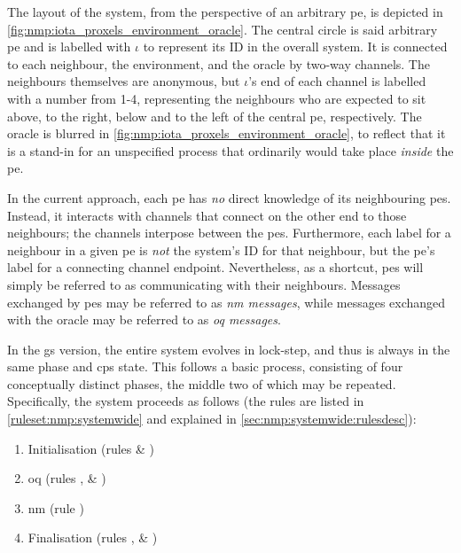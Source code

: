 The layout of the system, from the perspective of an arbitrary \gls{pe}, is depicted in \cref{fig:nmp:iota_proxels_environment_oracle}.  The central circle is said arbitrary \gls{pe} and is labelled with \(\iota\) to represent its ID in the overall system.  It is connected to each neighbour, the environment, and the oracle by two-way channels.  The neighbours themselves are anonymous, but \(\iota\)'s end of each channel is labelled with a number from 1-4, representing the neighbours who are expected to sit above, to the right, below and to the left of the central \gls{pe}, respectively.  The oracle is blurred in \cref{fig:nmp:iota_proxels_environment_oracle}, to reflect that it is a stand-in for an unspecified process that ordinarily would take place \emph{inside} the \gls{pe}.

In the current approach, each \gls{pe} has \emph{no} direct knowledge of its neighbouring \glspl{pe}.  Instead, it interacts with channels that connect on the other end to those neighbours; the channels interpose between the \glspl{pe}.  Furthermore, each label for a neighbour in a given \gls{pe} is \emph{not} the system's ID for that neighbour, but the \gls{pe}'s label for a connecting channel endpoint.  Nevertheless, as a shortcut, \glspl{pe} will simply be referred to as communicating with their neighbours.  Messages exchanged by \glspl{pe} may be referred to as \emph{\gls{nm} messages}, while messages exchanged with the oracle may be referred to as \emph{\gls{oq} messages}.

In the \gls{gs} version, the entire system evolves in lock-step, and thus is always in the same phase and \gls{cps} state.  This follows a basic process, consisting of four conceptually distinct phases, the middle two of which may be repeated.  Specifically, the system proceeds as follows (the rules are listed in \cref{ruleset:nmp:systemwide} and explained in \cref{sec:nmp:systemwide:rulesdesc}):

\begin{enumerate}
    \item\label{enumitem:nmp:init} Initialisation (rules  \& )
    \item\label{enumitem:nmp:pu} \Gls{oq} (rules ,  \& )
    \item\label{enumitem:nmp:nm} \Gls{nm} (rule )
    \item\label{enumitem:nmp:final} Finalisation (rules ,  \& )
\end{enumerate}

